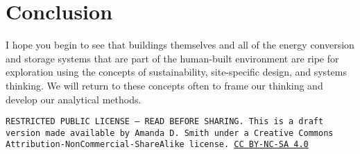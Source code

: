 \documentclass[10pt]{article}
\begin{document}
\section{Conclusion}

I hope you begin to see that buildings themselves and all of the energy conversion and storage systems that are part of the human-built environment are ripe for exploration using the concepts of sustainability, site-specific design, and systems thinking. We will return to these concepts often to frame our thinking and develop our analytical methods.




\bigskip

\noindent
\texttt{\footnotesize RESTRICTED PUBLIC LICENSE --- READ BEFORE SHARING. This is a draft version made available by Amanda D. Smith under a Creative Commons Attribution-NonCommercial-ShareAlike license. 
\href{https://creativecommons.org/licenses/by-nc-sa/4.0/}{CC BY-NC-SA 4.0}}

\newpage
\printbibliography
\end{document}
